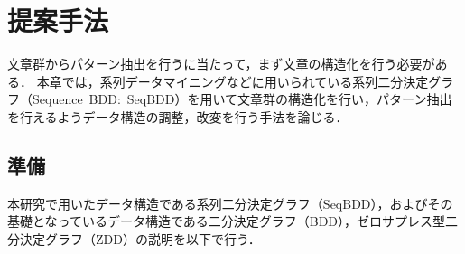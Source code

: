 \documentclass[12pt,twoside, fleqn]{ujbook}
\begin{document}
\chapter{提案手法}
\label{text:teiannsyuhou}
文章群からパターン抽出を行うに当たって，まず文章の構造化を行う必要がある．
本章では，系列データマイニングなどに用いられている系列二分決定グラフ（Sequence\ BDD:\ SeqBDD）を用いて文章群の構造化を行い，パターン抽出を行えるようデータ構造の調整，改変を行う手法を論じる．


\section{準備}
\label{text:junbi}
本研究で用いたデータ構造である系列二分決定グラフ（SeqBDD），およびその基礎となっているデータ構造である二分決定グラフ（BDD），ゼロサプレス型二分決定グラフ（ZDD）の説明を以下で行う．
\end{document}
